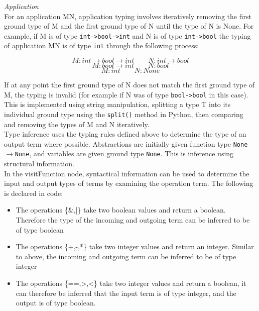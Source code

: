 \documentclass[a4paper,11pt]{report}
\begin{document}
\textit{Application}\\
For an application MN, application typing involves iteratively removing the first ground type of M and the first ground type of N until the type of N is None. For example, if M is of type \texttt{int->bool->int} and N is of type \texttt{int->bool} the typing of application MN is of type \texttt{int} through the following process:

\begin{equation*}
M:int\rightarrow bool\rightarrow int \qquad N:int\rightarrow bool
\end{equation*}
\begin{equation*}
M:bool\rightarrow int \qquad N:bool
\end{equation*}
\begin{equation*}
M:int \qquad N:None
\end{equation*}

If at any point the first ground type of N does not match the first ground type of M, the typing is invalid (for example if N was of type \texttt{bool->bool} in this case). This is implemented using string manipulation, splitting a type T into its individual ground type using the \texttt{split()} method in Python, then comparing and removing the types of M and N iteratively.\\

Type inference uses the typing rules defined above to determine the type of an output term where possible. Abstractions are initially given function type \texttt{None$\rightarrow$None}, and variables are given ground type \texttt{None}. This is inference using structural information.\\

In the visitFunction node, syntactical information can be used to determine the input and output types of terms by examining the operation term. The following is declared in code:

\begin{itemize}
	\item The operations \{\&,|\} take two boolean values and return a boolean. Therefore the type of the incoming and outgoing term can be inferred to be of type boolean
	\item The operations \{+,-,*\} take two integer values and return an integer. Similar to above, the incoming and outgoing term can be inferred to be of type integer
	\item The operations \{==,>,<\} take two integer values and return a boolean, it can therefore be inferred that the input term is of type integer, and the output is of type boolean. 
\end{itemize}
\end{document}
